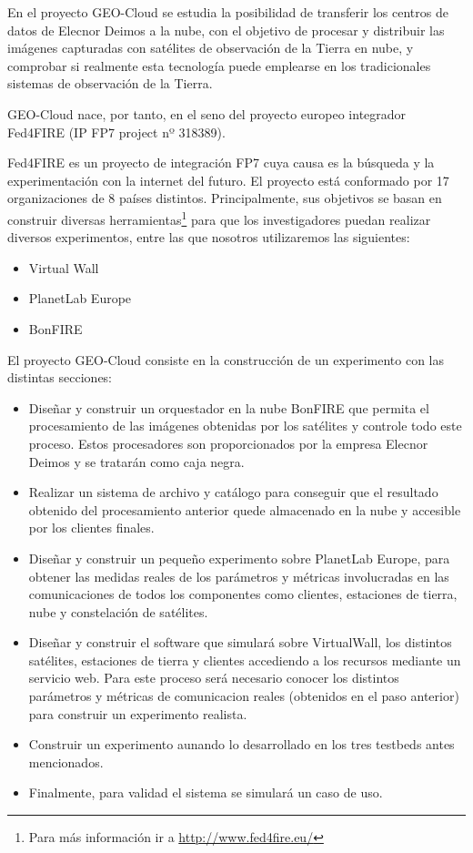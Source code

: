 En el proyecto GEO-Cloud se estudia la posibilidad de transferir los centros de datos de Elecnor Deimos a la nube, con el objetivo de procesar y distribuir las imágenes capturadas con satélites de observación de la Tierra en nube, y comprobar si realmente esta tecnología puede emplearse en los tradicionales sistemas de observación de la Tierra.

GEO-Cloud nace, por tanto, en el seno del proyecto europeo integrador Fed4FIRE (IP FP7 project nº 318389).

Fed4FIRE\cite{F4F} es un proyecto de integración FP7 cuya causa es la búsqueda y la experimentación con la internet del futuro. El proyecto está conformado por 17 organizaciones de 8 países distintos.
Principalmente, sus objetivos se basan en construir diversas herramientas\footnote{Para más información ir a \url{http://www.fed4fire.eu/}} para que los investigadores puedan realizar diversos experimentos, entre las que nosotros utilizaremos las siguientes:
\begin{itemize}
\item Virtual Wall
\item PlanetLab Europe
\item BonFIRE
\end{itemize}

El proyecto GEO-Cloud consiste en la construcción de un experimento con las distintas secciones:
\begin{itemize}
\item Diseñar y construir un orquestador en la nube BonFIRE que permita el procesamiento de las imágenes obtenidas por los satélites y controle todo este proceso. Estos procesadores son proporcionados por la empresa Elecnor Deimos y se tratarán como caja negra.

\item Realizar un sistema de archivo y catálogo para conseguir que el resultado obtenido del procesamiento anterior quede almacenado en la nube y accesible por los clientes finales.

\item Diseñar y construir un pequeño experimento sobre PlanetLab Europe, para obtener las medidas reales de los parámetros y métricas involucradas en las comunicaciones de todos los componentes como clientes, estaciones de tierra, nube y constelación de satélites.

\item Diseñar y construir el software que simulará sobre VirtualWall, los distintos satélites, estaciones de tierra y clientes accediendo a los recursos mediante un servicio web. Para este proceso será necesario  conocer los distintos parámetros y métricas de comunicacion reales (obtenidos en el paso anterior)  para construir un experimento realista.

\item Construir un experimento aunando lo desarrollado en los tres testbeds antes mencionados.

\item Finalmente, para validad el sistema se simulará un caso de uso.
\end{itemize}


